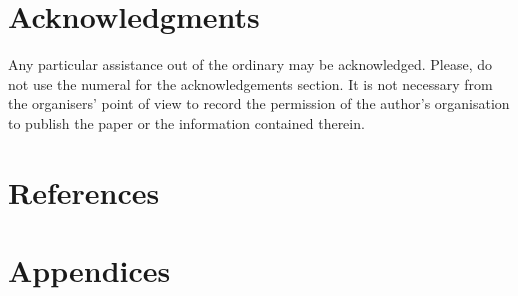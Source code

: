 \documentclass[a4paper]{article}
\begin{document}



\section*{Acknowledgments}
Any particular assistance out of the ordinary may be acknowledged.  Please, do not use the numeral for the acknowledgements section. It is not necessary from the organisers' point of view to record the permission of the author's organisation to publish the paper or the information contained therein.

\section*{References}





\section*{Appendices}
\end{document}

